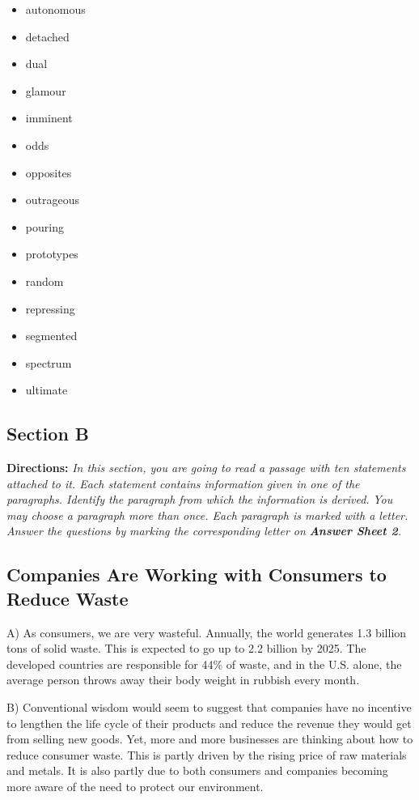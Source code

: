 \documentclass[UTF8,11pt]{ctexart}
\begin{document}
\begin{itemize}[leftmargin=2em,itemsep=.2em,topsep=.4em]\item[A.] autonomous
\item[B.] detached
\item[C.] dual
\item[D.] glamour
\item[E.] imminent
\item[F.] odds
\item[G.] opposites
\item[H.] outrageous
\item[I.] pouring
\item[J.] prototypes
\item[K.] random
\item[L.] repressing
\item[M.] segmented
\item[N.] spectrum
\item[O.] ultimate
\end{itemize}

\subsection*{\textbf{Section B}}


\textbf{Directions:}\textit{ In this section, you are going to read a passage with ten statements attached to it. Each statement} \textit{contains information given in one of the paragraphs. Identify the paragraph from which the information is derived.} \textit{You may choose a paragraph more than once. Each paragraph is marked with a letter. Answer the questions by} \textit{marking the corresponding letter on}\textbf{\textit{ Answer Sheet 2}}\textit{.}


\subsection*{\textbf{Companies Are Working with Consumers to Reduce Waste}}


A) As consumers, we are very wasteful. Annually, the world generates 1.3 billion tons of solid waste. This is expected to go up to 2.2 billion by 2025. The developed countries are responsible for 44\% of waste, and in the U.S. alone, the average person throws away their body weight in rubbish every month.


B) Conventional wisdom would seem to suggest that companies have no incentive to lengthen the life cycle of their products and reduce the revenue they would get from selling new goods. Yet, more and more businesses are thinking about how to reduce consumer waste. This is partly driven by the rising price of raw materials and metals. It is also partly due to both consumers and companies becoming more aware of the need to protect our environment.
\end{document}
